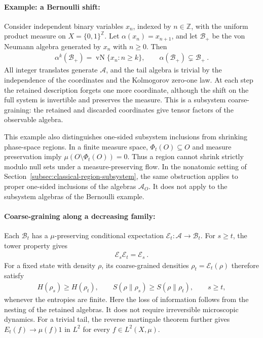 \documentclass[a4paper,11pt]{article}
\theoremstyle{definition}
\newcommand{\mA}{\mathcal{A}}
\newcommand{\mB}{\mathcal{B}}
\begin{document}
\paragraph{Example: a Bernoulli shift:}
Consider independent binary variables $x_n$, indexed by $n\in\mathbb Z$, with the uniform product measure on $X=\{0,1\}^{\mathbb Z}$. Let $\alpha(x_n)=x_{n+1}$, and let $\mB_+$ be the von Neumann algebra generated by $x_n$ with $n\geq0$. Then
\begin{align}
    \alpha^k(\mB_+)
    =\operatorname{vN}\{x_n:n\geq k\},
    \qquad
    \alpha(\mB_+)\subsetneq\mB_+\ .
\end{align}
All integer translates generate $\mA$, and the tail algebra is trivial by the independence of the coordinates and the Kolmogorov zero-one law. At each step the retained description forgets one more coordinate, although the shift on the full system is invertible and preserves the measure. This is a subsystem coarse-graining: the retained and discarded coordinates give tensor factors of the observable algebra.

This example also distinguishes one-sided subsystem inclusions from shrinking phase-space regions. In a finite measure space, $\Phi_t(O)\subseteq O$ and measure preservation imply $\mu(O\setminus\Phi_t(O))=0$. Thus a region cannot shrink strictly modulo null sets under a measure-preserving flow. In the nonatomic setting of Section~\ref{subsec:classical-region-subsystem}, the same obstruction applies to proper one-sided inclusions of the algebras $\mA_O$. It does not apply to the subsystem algebras of the Bernoulli example.

\paragraph{Coarse-graining along a decreasing family:}
Each $\mB_t$ has a $\mu$-preserving conditional expectation $\mathcal{E}_t:\mA\to\mB_t$. For $s\geq t$, the tower property gives
\begin{align}
    \mathcal{E}_s\mathcal{E}_t=\mathcal{E}_s\ .
\end{align}
For a fixed state with density $\rho$, its coarse-grained densities $\rho_t=\mathcal{E}_t(\rho)$ therefore satisfy
\begin{align}
    H(\rho_s)\geq H(\rho_t),
    \qquad
    S(\rho\|\rho_s)\geq S(\rho\|\rho_t),
    \qquad s\geq t,
\end{align}
whenever the entropies are finite. Here the loss of information follows from the nesting of the retained algebras. It does not require irreversible microscopic dynamics. For a trivial tail, the reverse martingale theorem further gives $E_t(f)\to\mu(f)1$ in $L^2$ for every $f\in L^2(X,\mu)$.
\end{document}
